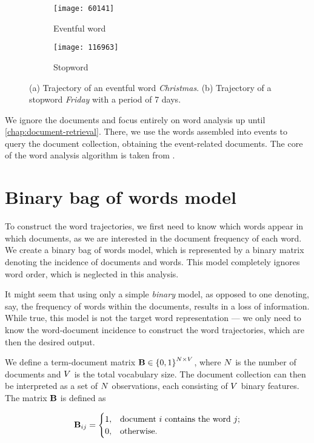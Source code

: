 \begin{figure}
\centering
\begin{subfigure}{.5\textwidth}
  \centering
  \texttt{[image: 60141]}  %
  \caption{Eventful word}
  \label{fig:vanoce}
\end{subfigure}%
\begin{subfigure}{.5\textwidth}
  \centering
  \texttt{[image: 116963]}  %
  \caption{Stopword}
  \label{fig:patek}
\end{subfigure}
\caption{(a) Trajectory of an eventful word \textit{Christmas}. (b) Trajectory of a stopword \textit{Friday} with a period of 7 days.}
\label{fig:eventful-vs-stopword}
\end{figure}

We ignore the documents and focus entirely on word analysis up until \autoref{chap:document-retrieval}. There, we use the words assembled into events to query the document collection, obtaining the event-related documents. The core of the word analysis algorithm is taken from \cite{event-detection}.


\section{Binary bag of words model} \label{sec:bowmat}
To construct the word trajectories, we first need to know which words appear in which documents, as we are interested in the document frequency of each word. We create a binary bag of words model, which is represented by a binary matrix denoting the incidence of documents and words. This model completely ignores word order, which is neglected in this analysis.

It might seem that using only a simple \textit{binary} model, as opposed to one denoting, say, the frequency of words within the documents, results in a loss of information. While true, this model is not the target word representation --- we only need to know the word-document incidence to construct the word trajectories, which are then the desired output.

We define a term-document matrix $\mathbf{B} \in \left\{ 0, 1 \right\}^{N \times V}$, where $N$ is the number of documents and $V$ is the total vocabulary size. The document collection can then be interpreted as a set of $N$ observations, each consisting of $V$ binary features. The matrix $\mathbf{B}$ is defined as

\begin{equation} \label{eq:bow-matrix}
	\mathbf{B}_{ij} =
	\begin{cases}
		1, & \text{document}~i~\text{contains the word}~j \text{;} \\
		0, & \text{otherwise.}
	\end{cases}
\end{equation}

